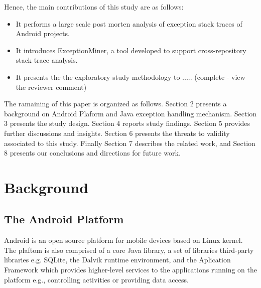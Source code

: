 \documentclass[conference]{IEEEtran}
\begin{document}
Hence, the main contributions of this study are as follows:
\begin{itemize}

  \item  It performs a large scale post morten analysis of exception stack traces of Android projects.

  \item  It introduces ExceptionMiner, a tool developed to support cross-repository stack trace
    analysis.

  \item  It presents the the exploratory study methodology to ..... (complete - view the reviewer comment)

\end{itemize}



The ramaining of this paper is organized as follows. Section 2 presents a
background on Android Plaform and Java exception handling mechanism. 
Section 3 presents the study design. Section 4 reports study findings. 
Section 5 provides further discussions and insights.
Section 6 presents the threats to validity associated to this study. Finally Section
7 describes the related work, and Section 8 presents our conclusions and
directions for future work.

\section{Background}

\subsection{The Android Platform} \label{sec:extypes}

Android is an open source platform for mobile devices based on Linux kernel.
The plaftom is also comprised of a core Java library, a set of libraries third-party libraries e.g.  SQLite,
the Dalvik runtime environment, and the Aplication Framework which provides higher-level services to the applications
running on the platform e.g., controlling activities or providing data access.
\end{document}
